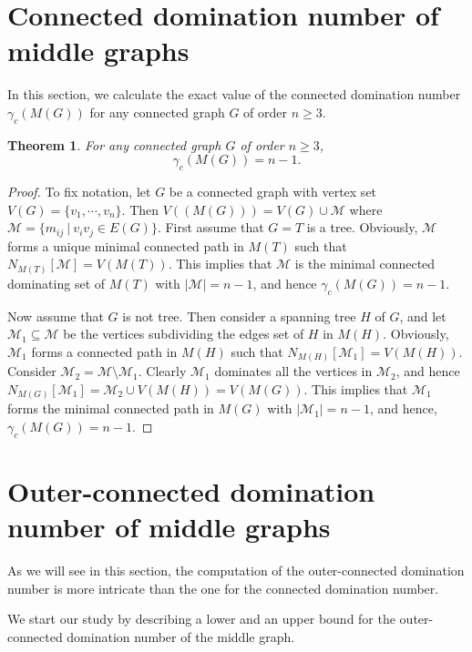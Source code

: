 \documentclass[a4paper,12pt, reqno]{amsart}
\newtheorem{Theorem}{Theorem}[section]
\begin{document}
\section{\bf Connected domination number of middle graphs}
In this section, we calculate the exact value of the connected domination number $\gamma _{c}(M(G))$ for any connected graph $G$ of order $n \geq 3$.
\begin{Theorem}\label{gammacMG}
For any connected graph $G$ of order $n \geq 3$,
$$\gamma _{c}(M(G))=n-1.$$
\end{Theorem}
\begin{proof}
To fix notation, let $G$ be a connected graph with vertex set $V(G)=\{v_1, \cdots, v_n\}$. Then $V((M(G)))=V(G) \cup \mathcal{M}$ where $\mathcal{M}=\{m_{ij}~|~v_iv_j \in E(G)\}$. %
First assume that $G=T$ is a tree. Obviously, $\mathcal{M}$ forms a unique minimal connected path in $M(T)$ such that $N_{M(T)}[\mathcal{M}]=V(M(T))$. This implies that $\mathcal{M}$ is the minimal connected dominating set of $M(T)$ with $|\mathcal{M}|=n-1$, and hence $\gamma _{c}(M(G))=n-1$.

Now assume that $G$ is not tree. Then consider a spanning tree $H$ of $G$, and let $\mathcal{M}_1 \subseteq \mathcal{M}$ be the vertices subdividing the edges set of $H$ in $M(H)$.  Obviously, $\mathcal{M}_1$ forms a connected path in $M(H)$ such that $N_{M(H)}[\mathcal{M}_1]=V(M(H))$. Consider $\mathcal{M}_2 =\mathcal{M}\setminus\mathcal{M}_1$. Clearly $\mathcal{M}_1$  dominates all the vertices in $\mathcal{M}_2$, and hence $N_{M(G)}[\mathcal{M}_1]=\mathcal{M}_2 \cup V(M(H))=V(M(G))$. This implies that $\mathcal{M}_1$ forms the minimal connected path in $M(G)$ with $|\mathcal{M}_1|=n-1$, and hence, $\gamma _{c}(M(G))=n-1$.
\end{proof}



\section{\bf Outer-connected domination number of middle graphs}
As we will see in this section, the computation of the outer-connected domination number is more intricate than the one for the connected domination number.

We start our study by describing a lower and an upper bound for the outer-connected domination number of the middle graph.
\end{document}

